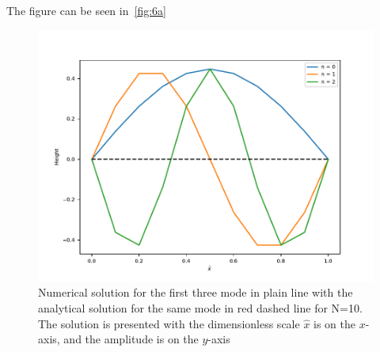 \documentclass[a4paper,10pt,english]{article}
\begin{document}
			\section{} %
			\subsection{}
			The figure can be seen in~\autoref{fig:6a}
            \begin{figure}[ht]
              \centering
              \includegraphics[width=1.0\linewidth]{figures/prob_6a.pdf}
              \caption{Numerical solution for the first three mode in plain line with the analytical solution for the same mode in red dashed line for N=10. The solution is presented with the dimensionless scale $\hat{x}$ is on the $x$-axis, and the amplitude is on the $y$-axis\label{fig:6a} }
            \end{figure}

			\subsection{}
\end{document}
